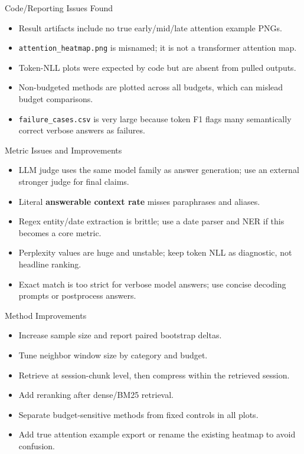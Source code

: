 \documentclass[aspectratio=169]{beamer}
\newcommand{\method}[1]{\texttt{#1}}
\newcommand{\metric}[1]{\textbf{#1}}
\begin{document}
\begin{frame}{Code/Reporting Issues Found}
\begin{itemize}
  \item Result artifacts include no true early/mid/late attention example PNGs.
  \item \method{attention\_heatmap.png} is misnamed; it is not a transformer attention map.
  \item Token-NLL plots were expected by code but are absent from pulled outputs.
  \item Non-budgeted methods are plotted across all budgets, which can mislead budget comparisons.
  \item \method{failure\_cases.csv} is very large because token F1 flags many semantically correct verbose answers as failures.
\end{itemize}
\end{frame}

\begin{frame}{Metric Issues and Improvements}
\begin{itemize}
  \item LLM judge uses the same model family as answer generation; use an external stronger judge for final claims.
  \item Literal \metric{answerable context rate} misses paraphrases and aliases.
  \item Regex entity/date extraction is brittle; use a date parser and NER if this becomes a core metric.
  \item Perplexity values are huge and unstable; keep token NLL as diagnostic, not headline ranking.
  \item Exact match is too strict for verbose model answers; use concise decoding prompts or postprocess answers.
\end{itemize}
\end{frame}

\begin{frame}{Method Improvements}
\begin{itemize}
  \item Increase sample size and report paired bootstrap deltas.
  \item Tune neighbor window size by category and budget.
  \item Retrieve at session-chunk level, then compress within the retrieved session.
  \item Add reranking after dense/BM25 retrieval.
  \item Separate budget-sensitive methods from fixed controls in all plots.
  \item Add true attention example export or rename the existing heatmap to avoid confusion.
\end{itemize}
\end{frame}
\end{document}
